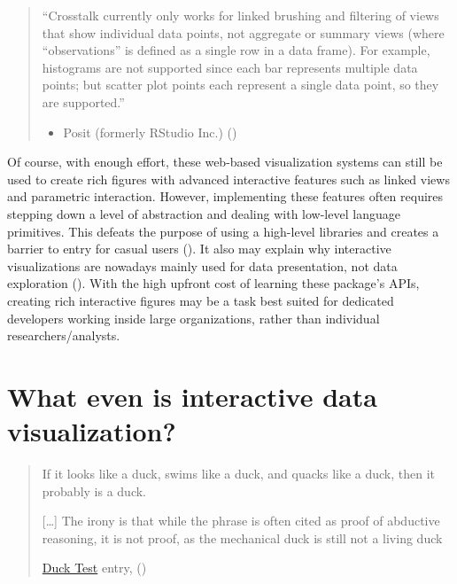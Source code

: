 \documentclass[
]{book}
\providecommand{\tightlist}{%
  \setlength{\itemsep}{0pt}\setlength{\parskip}{0pt}}
\theoremstyle{definition}
\theoremstyle{definition}
\theoremstyle{definition}
\theoremstyle{definition}
\theoremstyle{remark}
\begin{document}
\begin{quote}
``Crosstalk currently only works for linked brushing and filtering of views that show individual data points, not aggregate or summary views (where ``observations'' is defined as a single row in a data frame). For example, histograms are not supported since each bar represents multiple data points; but scatter plot points each represent a single data point, so they are supported.''

\begin{itemize}
\tightlist
\item
  Posit (formerly RStudio Inc.) ()
\end{itemize}
\end{quote}

Of course, with enough effort, these web-based visualization systems can still be used to create rich figures with advanced interactive features such as linked views and parametric interaction. However, implementing these features often requires stepping down a level of abstraction and dealing with low-level language primitives. This defeats the purpose of using a high-level libraries and creates a barrier to entry for casual users (). It also may explain why interactive visualizations are nowadays mainly used for data presentation, not data exploration (). With the high upfront cost of learning these package's APIs, creating rich interactive figures may be a task best suited for dedicated developers working inside large organizations, rather than individual researchers/analysts.

\section{What even is interactive data visualization?}\label{what-is-interactive-visualization}

\begin{quote}
If it looks like a duck, swims like a duck, and quacks like a duck, then it probably is a duck.

{[}\ldots{]} The irony is that while the phrase is often cited as proof of abductive reasoning, it is not proof, as the mechanical duck is still not a living duck

\href{https://en.wikipedia.org/wiki/Duck_test}{Duck Test} entry, ()
\end{quote}
\end{document}
